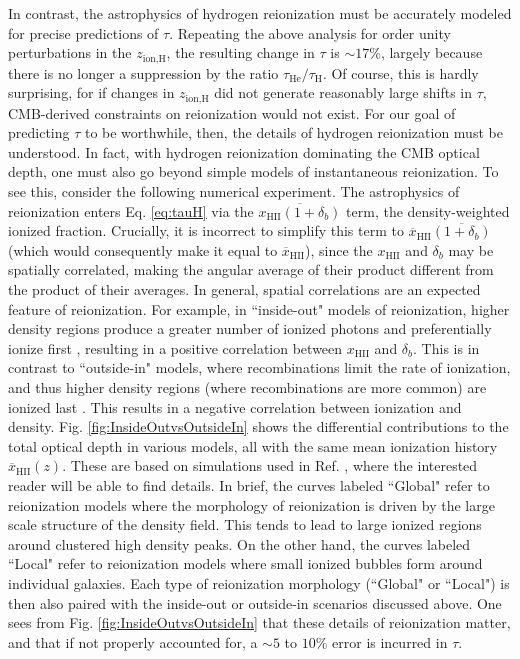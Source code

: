 \documentclass[twocolumn,aps,prd,nofootinbib,showpacs]{revtex4-1}
\begin{document}
In contrast, the astrophysics of hydrogen reionization must be accurately modeled for precise predictions of $\tau$. Repeating the above analysis for order unity perturbations in the $z_\textrm{ion,H}$, the resulting change in $\tau$ is $\sim 17\%$, largely because there is no longer a suppression by the ratio $\tau_\textrm{He} / \tau_\textrm{H}$. Of course, this is hardly surprising, for if changes in $z_\textrm{ion,H}$ did not generate reasonably large shifts in $\tau$, CMB-derived constraints on reionization would not exist. For our goal of predicting $\tau$ to be worthwhile, then, the details of hydrogen reionization must be understood. In fact, with hydrogen reionization dominating the CMB optical depth, one must also go beyond simple models of instantaneous reionization. To see this, consider the following numerical experiment. The astrophysics of reionization enters Eq. \eqref{eq:tauH} via the $\overline{x_\textrm{HII} (1+\delta_b)}$ term, the density-weighted ionized fraction. Crucially, it is incorrect to simplify this term to $\overline{x}_\textrm{HII}\overline{ (1+\delta_b)}$ (which would consequently make it equal to $\overline{x}_\textrm{HII}$), since the $x_\textrm{HII}$ and $\delta_b$ may be spatially correlated, making the angular average of their product different from the product of their averages. In general, spatial correlations are an expected feature of reionization. For example, in ``inside-out" models of reionization, higher density regions produce a greater number of ionized photons and preferentially ionize first \cite{barkana_and_loeb2004,furlanetto_et_al2006}, resulting in a positive correlation between $x_\textrm{HII}$ and $\delta_b$. This is in contrast to ``outside-in" models, where recombinations limit the rate of ionization, and thus higher density regions (where recombinations are more common) are ionized last \cite{Miralda-Escude_et_al2000}. This results in a negative correlation between ionization and density. Fig. \ref{fig:InsideOutvsOutsideIn} shows the differential contributions to the total optical depth in various models, all with the same mean ionization history $\overline{x}_\textrm{HII} (z) $. These are based on simulations used in Ref. \cite{watkinson_and_pritchard2014}, where the interested reader will be able to find details. In brief, the curves labeled ``Global" refer to reionization models where the morphology of reionization is driven by the large scale structure of the density field. This tends to lead to large ionized regions around clustered high density peaks. On the other hand, the curves labeled ``Local" refer to reionization models where small ionized bubbles form around individual galaxies. Each type of reionization morphology (``Global" or ``Local") is then also paired with the inside-out or outside-in scenarios discussed above. One sees from Fig. \ref{fig:InsideOutvsOutsideIn} that these details of reionization matter, and that if not properly accounted for, a $\sim 5$ to $10\%$ error is incurred in $\tau$.
\end{document}
